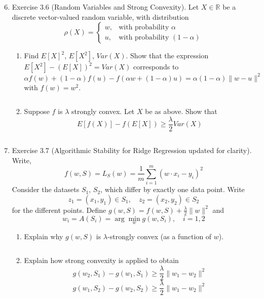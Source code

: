 \documentclass[
10pt, %
a4paper, %
oneside, %
headinclude,footinclude, %
BCOR5mm, %
]{scrartcl}
\begin{document}
\begin{enumerate}
\setcounter{enumi}{5}
    \item Exercise 3.6 (Random Variables and Strong Convexity). Let $X \in \mathbb{R}$ be a discrete vector-valued random variable, with distribution
    \[
    \rho(X) =
    \begin{cases}
      w, & \text{with probability }\alpha \\
      u, & \text{with probability }(1 - \alpha)
    \end{cases}
    \]
    \begin{enumerate}
        \item Find $E[X]^2$, $E[X^2]$, $Var(X)$. Show that the expression $E[X^2] - (E[X])^2 = Var(X)$ corresponds to
        \[
        \alpha f(w) + (1 - \alpha) f(u) - f(\alpha w + (1 - \alpha) u) = \alpha (1 - \alpha) \|w - u\|^2
        \]
        with $f(w) = w^2$.

        \[\] %

        \item Suppose $f$ is $\lambda$ strongly convex. Let $X$ be as above. Show that
        \[
        E[f(X)] - f(E[X]) \geq \frac{\lambda}{2} Var(X)
        \]

        \[\] %
    \end{enumerate}

    \item Exercise 3.7 (Algorithmic Stability for Ridge Regression updated for clarity). Write,
    \[
    f(w, S) = L_S(w) = \frac{1}{m} \sum_{i=1}^{m} (w \cdot x_i - y_i)^2
    \]
    Consider the datasets $S_1$, $S_2$, which differ by exactly one data point. Write
    \[
    z_1 = (x_1, y_1) \in S_1, \quad z_2 = (x_2, y_2) \in S_2
    \]
    for the different points. Define $g(w, S) = f(w, S) + \frac{\lambda}{2} \|w\|^2$ and
    \[
    w_i = A(S_i) = \arg\min_w g(w, S_i), \quad i = 1, 2
    \]
    \begin{enumerate}
        \item Explain why $g(w, S)$ is $\lambda$-strongly convex (as a function of $w$).

        \[\] %

        \item Explain how strong convexity is applied to obtain
        \[
        g(w_2, S_1) - g(w_1, S_1) \geq \frac{\lambda}{2} \|w_1 - w_2\|^2
        \]
        \[
        g(w_1, S_2) - g(w_2, S_2) \geq \frac{\lambda}{2} \|w_1 - w_2\|^2
        \]


\end{enumerate}
\end{enumerate}
\end{document}
